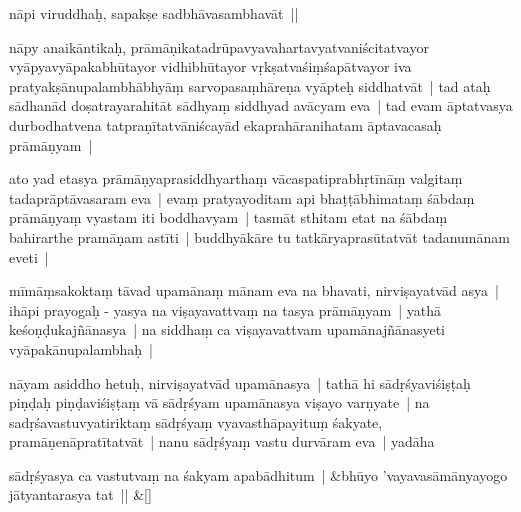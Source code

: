 \documentclass[article,12pt,a4paper]{memoir}%
\newcounter{parCount}
\begin{document}
	  \pstart \leavevmode%
	\label{thakur75-101.28}nāpi viruddhaḥ, sapakṣe sadbhāvasambhavāt ||
	{}
	\pend%
      

	  \pstart \leavevmode%
	\label{thakur75-101.29}nāpy anaikāntikaḥ, prāmāṇikatadrūpavyavahartavyatvaniścitatvayor vyāpyavyāpakabhūtayor vidhibhūtayor vṛkṣatvaśiṃśapātvayor iva pratyakṣānupalambhābhyāṃ sarvopasaṃhāreṇa vyāpteḥ siddhatvāt | tad ataḥ sādhanād doṣatrayarahitāt sādhyaṃ siddhyad avācyam eva | tad evam āptatvasya durbodhatvena tatpraṇītatvāniścayād ekaprahāranihatam āptavacasaḥ prāmāṇyam |
	{}
	\pend%
      

	  \pstart \leavevmode%
	\label{thakur75-102.4}ato yad etasya prāmāṇyaprasiddhyarthaṃ vācaspatiprabhṛtīnāṃ valgitaṃ tadaprāptāvasaram eva | evaṃ pratyayoditam api bhaṭṭābhimataṃ śābdaṃ prāmāṇyaṃ vyastam iti boddhavyam | tasmāt sthitam etat na śābdaṃ bahirarthe pramāṇam astīti | buddhyākāre tu tatkāryaprasūtatvāt tadanumānam eveti |
	{}
	\pend%
      

	  \pstart \leavevmode%
	\label{thakur75-102.7}mīmāṃsakoktaṃ tāvad upamānaṃ mānam eva na bhavati, nirviṣayatvād asya | ihāpi prayogaḥ - yasya na viṣayavattvaṃ na tasya prāmāṇyam | yathā keśoṇḍukajñānasya | na siddhaṃ ca viṣayavattvam upamānajñānasyeti vyāpakānupalambhaḥ |
	{}
	\pend%
      

	  \pstart \leavevmode%
	\label{thakur75-102.11}nāyam asiddho hetuḥ, nirviṣayatvād upamānasya | tathā hi sādṛśyaviśiṣṭaḥ piṇḍaḥ piṇḍaviśiṣṭaṃ vā sādṛśyam upamānasya viṣayo varṇyate | na sadṛśavastuvyatiriktaṃ sādṛśyaṃ vyavasthāpayituṃ śakyate, pramāṇenāpratītatvāt | \label{thakur75-102.14} nanu sādṛśyaṃ vastu durvāram eva | yadāha
	{}
	\pend%
      
	    
	    \stanza[\smallbreak]
	  sādṛśyasya ca vastutvaṃ na śakyam apabādhitum | &bhūyo 'vayavasāmānyayogo jātyantarasya tat || \&[\smallbreak]
	  
\end{document}
